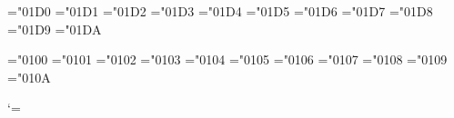 

\def\@@sqrt{\radical"39F370 }	%





\mathchardef\Gamma="01D0
\mathchardef\Delta="01D1
\mathchardef\Theta="01D2
\mathchardef\Lambda="01D3
\mathchardef\Xi="01D4
\mathchardef\Pi="01D5
\mathchardef\Sigma="01D6
\mathchardef\Upsilon="01D7
\mathchardef\Phi="01D8
\mathchardef\Psi="01D9
\mathchardef\Omega="01DA


\mathchardef\varGamma="0100
\mathchardef\varDelta="0101
\mathchardef\varTheta="0102
\mathchardef\varLambda="0103
\mathchardef\varXi="0104
\mathchardef\varPi="0105
\mathchardef\varSigma="0106
\mathchardef\varUpsilon="0107
\mathchardef\varPhi="0108
\mathchardef\varPsi="0109
\mathchardef\varOmega="010A


\catcode`\@=\atcode		%

\rm

\endinput





